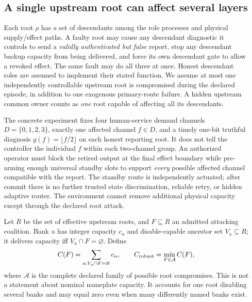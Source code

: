 \documentclass[11pt,a4paper]{article}
\theoremstyle{definition}\newtheorem{definition}{Definition}
\begin{document}
\subsection{A single upstream root can affect several layers}
Each root $\rho$ has a set of descendants among the role processes and physical supply/effect paths. A faulty root may cause any descendant diagnostic it controls to send a \emph{validly authenticated but false} report, stop any descendant backup capacity from being delivered, and force its own descendant gate to allow a revoked effect. The same fault may do all three at once. Honest descendant roles are assumed to implement their stated function. We assume at most one independently controllable upstream root is compromised during the declared episode, in addition to one exogenous primary-route failure. A hidden upstream common owner counts as \emph{one} root capable of affecting all its descendants.

The concrete experiment fixes four human-service demand channels $D=\{0,1,2,3\}$, exactly one affected channel $f\in D$, and a timely one-bit truthful diagnosis $g(f)=\lfloor f/2\rfloor$ on each honest reporting root. It does not tell the controller the individual $f$ within each two-channel group. An authorized operator must block the retired output at the final effect boundary while pre-arming enough universal standby slots to support \emph{every} possible affected channel compatible with the report. The standby route is independently actuated; after commit there is no further trusted state discrimination, reliable retry, or hidden adaptive router. The environment cannot remove additional physical capacity except through the declared root attack.

Let $R$ be the set of effective upstream roots, and $F\subseteq R$ an admitted attacking coalition. Bank $u$ has integer capacity $c_u$ and disable-capable ancestor set $V_u\subseteq R$; it delivers capacity iff $V_u\cap F=\varnothing$. Define
\begin{equation}\label{eq:capacity-root}
C(F)=\sum_{u:V_u\cap F=\varnothing}c_u,
\qquad C_{\rm robust}=\min_{F\in\mathcal A}C(F),
\end{equation}
where $\mathcal A$ is the complete declared family of possible root compromises. This is not a statement about nominal nameplate capacity. It accounts for one root disabling several banks and may equal zero even when many differently named banks exist.
\end{document}
